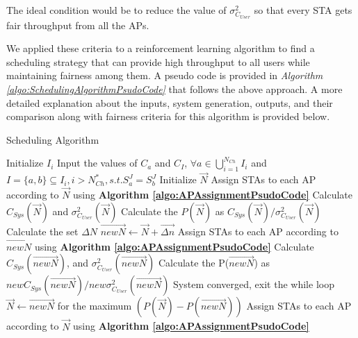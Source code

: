 The ideal condition would be to reduce the value of $\sigma_{C_{User}}^2$ so that every STA gets fair throughput from all the APs.

We applied these criteria to a reinforcement learning algorithm to find a scheduling strategy that can provide high throughput to all users while maintaining fairness among them.
A pseudo code is provided in \textit{Algorithm \ref{algo:SchedulingAlgorithmPsudoCode}} that follows the above approach. A more detailed explanation about the inputs, system generation, outputs, and their comparison along with fairness criteria for this algorithm is provided below.




%
%
\begin{algorithm}[h]
    \caption{Scheduling Algorithm}
    \label{algo:SchedulingAlgorithmPsudoCode}
    \begin{algorithmic}[1]
        \State Initialize $I_i$
        \State Input the values of $C_a$ and $C_I$, $\forall a \in \bigcup\limits_{i=1}^{N_{Ch}} I_{i}$ and $I=\{a,b\} \subseteq I_i, i > N_{Ch}^*, s.t. S_a^J=S_b^J$
        \State Initialize $\Vec{N}$
        \State Assign STAs to each AP according to $\vec{N}$ using \textbf{Algorithm \ref{algo:APAssignmentPsudoCode}}
        \State Calculate $C_{Sys}(\vec{N})$ and $\sigma^2_{C_{User}}(\vec{N})$
        \State Calculate the $P(\vec{N})$ as $C_{Sys}(\vec{N}) / \sigma^2_{C_{User}}(\vec{N})$
        \State Calculate the set $\Delta {N}$
                \State $\overrightarrow{newN} \gets \vec{N} + \overrightarrow{\Delta n}$
                \State Assign STAs to each AP according to $\overrightarrow{newN}$ using \textbf{Algorithm \ref{algo:APAssignmentPsudoCode}}
                \State Calculate $C_{Sys}(\overrightarrow{newN})$, and $\sigma^2_{C_{User}}(\overrightarrow{newN})$
                \State Calculate the P($\overrightarrow{newN}$) as $newC_{Sys}(\overrightarrow{newN}) / new\sigma^2_{C_{User}}(\overrightarrow{newN})$
            \EndFor
                \State System converged, exit the while loop
            \Else
                \State $\vec{N} \gets \overrightarrow{newN}$ for the maximum $(P(\vec{N}) - P(\overrightarrow{newN}))$
                \State Assign STAs to each AP according to $\vec{N}$ using \textbf{Algorithm \ref{algo:APAssignmentPsudoCode}}
            \EndIf
        \EndWhile
    \end{algorithmic}
\end{algorithm}



